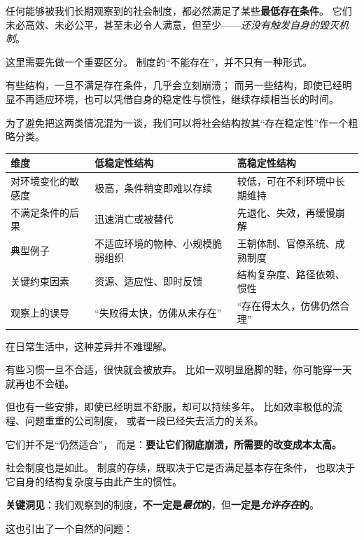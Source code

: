 \documentclass[openany, a4paper, 12pt]{book}
\begin{document}
	任何能够被我们长期观察到的社会制度，都必然满足了某些\textbf{最低存在条件}。  
	它们未必高效、未必公平，甚至未必令人满意，但至少——\textit{还没有触发自身的毁灭机制}。
	
	这里需要先做一个重要区分。  
	制度的“不能存在”，并不只有一种形式。
	
	有些结构，一旦不满足存在条件，几乎会立刻崩溃；  
	而另一些结构，即使已经明显不再适应环境，也可以凭借自身的稳定性与惯性，继续存续相当长的时间。
	
	为了避免把这两类情况混为一谈，我们可以将社会结构按其“存在稳定性”作一个粗略分类。
	
	
	\begin{center}
		\begin{tabular}{|p{3.5cm}|p{5cm}|p{5cm}|}
			\hline
			\textbf{维度} & \textbf{低稳定性结构} & \textbf{高稳定性结构} \\
			\hline
			对环境变化的敏感度 &
			极高，条件稍变即难以存续 &
			较低，可在不利环境中长期维持 \\
			\hline
			不满足条件的后果 &
			迅速消亡或被替代 &
			先退化、失效，再缓慢崩解 \\
			\hline
			典型例子 &
			不适应环境的物种、小规模脆弱组织 &
			王朝体制、官僚系统、成熟制度 \\
			\hline
			关键约束因素 &
			资源、适应性、即时反馈 &
			结构复杂度、路径依赖、惯性 \\
			\hline
			观察上的误导 &
			“失败得太快，仿佛从未存在” &
			“存在得太久，仿佛仍然合理” \\
			\hline
		\end{tabular}
	\end{center}
	
	
	在日常生活中，这种差异并不难理解。
	
	有些习惯一旦不合适，很快就会被放弃。  
	比如一双明显磨脚的鞋，你可能穿一天就再也不会碰。
	
	但也有一些安排，即使已经明显不舒服，却可以持续多年。  
	比如效率极低的流程、问题重重的公司制度，  
	或者一段已经失去活力的关系。
	
	它们并不是“仍然适合”，  
	而是：\textbf{要让它们彻底崩溃，所需要的改变成本太高。}
	
	社会制度也是如此。  
	制度的存续，既取决于它是否满足基本存在条件，  
	也取决于它自身的结构复杂度与由此产生的惯性。
	
	
	\textbf{\Large 关键洞见}：我们观察到的制度，\textbf{不一定是\textit{最优}的}，但\textbf{一定是\textit{允许存在}的}。
	
	这也引出了一个自然的问题：
	
\end{document}
